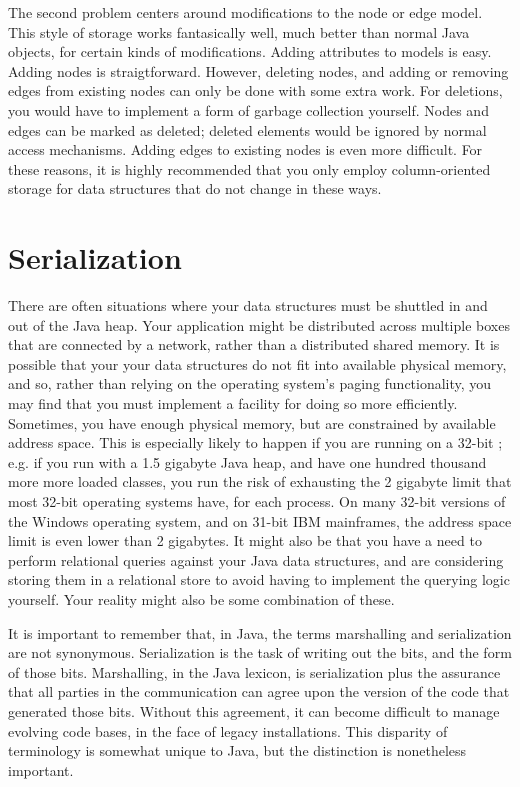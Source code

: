 The second problem centers around modifications to the node or edge model. This
style of storage works fantasically well, much better than normal Java objects,
for certain kinds of modifications. Adding attributes to models is easy.
Adding nodes is straigtforward. However, deleting nodes, and adding or
removing edges from existing nodes can only be done with some extra work. For
deletions, you would have to implement a form of garbage collection yourself.
Nodes and edges can be marked as deleted; deleted elements would be ignored by
normal access mechanisms. Adding edges to existing nodes is even more difficult.
For these reasons, it is highly recommended that you only employ column-oriented
storage for data structures that do not change in these ways.

\section{Serialization}

There are often situations where your data structures must be shuttled in and out
of the Java heap. Your application might be distributed across multiple boxes
that are connected by a network, rather than a distributed shared memory. It is
possible that your your data structures do not fit into available physical
memory, and so, rather than relying on the operating system's paging
functionality, you may find that you must implement a facility for doing so more
efficiently. Sometimes, you have enough physical memory, but are constrained by
available address space. This is especially
likely to happen if you are running on a 32-bit \jre; e.g. if you run with a 1.5
gigabyte Java heap, and have one hundred thousand more more loaded classes, you
run the risk of exhausting the 2 gigabyte limit that most 32-bit operating
systems have, for each process. On many 32-bit versions of the Windows operating
system, and on 31-bit IBM mainframes, the address space limit is even lower than
2 gigabytes. It might also be that you have a need to perform relational queries
against your Java data structures, and are considering storing them in a
relational store to avoid having to implement the querying logic yourself. Your
reality might also be some combination of these.

It is important to remember that, in Java, the terms marshalling and
serialization are not synonymous. Serialization is the task of writing out the
bits, and the form of those bits. Marshalling, in the Java lexicon, is
serialization plus the assurance that all parties in the communication can agree
upon the version of the code that generated those bits. Without this agreement,
it can become difficult to manage evolving code bases, in the face of legacy
installations. This disparity of terminology is somewhat unique to Java, but the
distinction is nonetheless important. 

